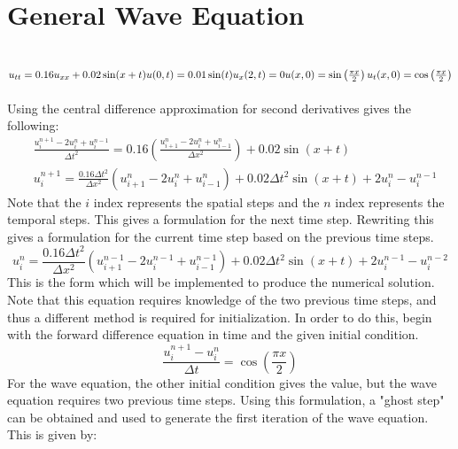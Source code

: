 \documentclass{article}
\begin{document}
\section{General Wave Equation}
\subsection*{$u_{tt} = 0.16u_{xx} + 0.02\sin(x+t)\\u(0,t) = 0.01\sin(t)\\u_x(2,t) = 0\\u(x,0) = \sin\left(\frac{\pi x}{2}\right)\\u_t(x,0) = \cos\left(\frac{\pi x}{2}\right)$}
Using the central difference approximation for second derivatives gives the following:
\begin{equation}
    \begin{aligned}
        &\frac{u_i^{n+1} - 2u_i^n + u_i^{n-1}}{\Delta t^2} = 0.16\left(\frac{u_{i+1}^n - 2u_i^n + u_{i-1}^n}{\Delta x^2}\right) + 0.02\sin\left(x+t\right)\\
        &u_i^{n+1} = \frac{0.16\Delta t^2}{\Delta x^2}\left(u_{i+1}^n - 2u_i^n + u_{i-1}^n\right) + 0.02\Delta t^2\sin\left(x+t\right) + 2u_i^n - u_i^{n-1}
    \end{aligned}
\end{equation}
Note that the $i$ index represents the spatial steps and the $n$ index represents the temporal steps. This gives a formulation for the next time step. Rewriting this gives a formulation for the current time step based on the previous time steps.
\begin{equation}
    u_i^{n} = \frac{0.16\Delta t^2}{\Delta x^2}\left(u_{i+1}^{n-1} - 2u_i^{n-1} + u_{i-1}^{n-1}\right) + 0.02\Delta t^2\sin\left(x+t\right) + 2u_i^{n-1} - u_i^{n-2}
\end{equation}
This is the form which will be implemented to produce the numerical solution. Note that this equation requires knowledge of the two previous time steps, and thus a different method is required for initialization. In order to do this, begin with the forward difference equation in time and the given initial condition.
\begin{equation}
    \frac{u_i^{n+1} - u_i^n}{\Delta t} = \cos\left(\frac{\pi x}{2}\right)
\end{equation}
For the wave equation, the other initial condition gives the value, but the wave equation requires two previous time steps. Using this formulation, a "ghost step" can be obtained and used to generate the first iteration of the wave equation. This is given by:
\end{document}
